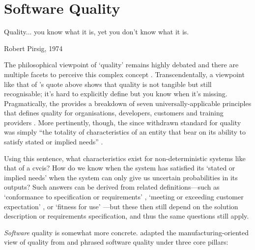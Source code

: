 \section{Software Quality}
\label{sec:background:software-quality}

\epigraph{Quality... you know what it is, yet you don't know what it is.}{Robert Pirsig, 1974 \citep{Pirsig:1974vs}}

\noindent
The philosophical viewpoint of `quality' remains highly debated and there are multiple facets to perceive this complex concept \citep{Garvin:1984vf}. Transcendentally, a viewpoint like that of \citeauthor{Pirsig:1974vs}'s quote above shows that quality is not tangible but still recognisable; it's hard to explicitly define but you know when it's missing. Pragmatically, the \citeauthor{ISO8402:1986} provides a breakdown of seven universally-applicable principles that defines quality for organisations, developers, customers and training providers \citep{ISO9000:2015}. More pertinently, though, the since withdrawn \citeyear{ISO8402:1986} standard for quality was simply ``the totality of characteristics of an entity that bear on its ability to satisfy stated or implied needs'' \citep{ISO8402:1986}.

Using this sentence, what characteristics exist for non-deterministic systems like that of a \gls{cvcis}? How do we know when the system has satisfied its `stated or implied needs' when the system can only give us uncertain probabilities in its outputs? Such answers can be derived from related definitions---such as `conformance to specification or requirements' \citep{Gilmore:1974um,Crosby:1979uy}, `meeting or exceeding customer expectation' \citep{Parasuraman:1988wh}, or `fitness for use' \citep{Juran:1988tg}---but these then still depend on the solution description or requirements specification, and thus the same questions still apply.

\textit{Software} quality is somewhat more concrete. \citet{Pressman:2005vf} adapted the manufacturing-oriented view of quality from \citep{Bessin:2004vc} and phrased software quality under three core pillars:

